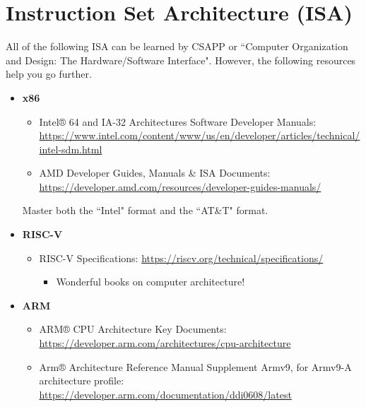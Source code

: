 \documentclass{article}
\begin{document}
\section{Instruction Set Architecture (ISA)}
All of the following ISA can be learned by CSAPP or ``Computer Organization and Design: The Hardware/Software Interface".
However, the following resources help you go further.
\begin{itemize}
    \item \textbf{x86}
    \begin{itemize}
        \item Intel® 64 and IA-32 Architectures Software Developer Manuals:\\
        \href{https://www.intel.com/content/www/us/en/developer/articles/technical/intel-sdm.html}{https://www.intel.com/content/www/us/en/developer/articles/technical/intel-sdm.html}
        \item AMD Developer Guides, Manuals \& ISA Documents:\\
        \href{https://developer.amd.com/resources/developer-guides-manuals/}{https://developer.amd.com/resources/developer-guides-manuals/}
    \end{itemize}
    Master both the ``Intel" format and the ``AT\&T" format.
    \item \textbf{RISC-V}
    \begin{itemize}
        \item RISC-V Specifications:
        \href{https://riscv.org/technical/specifications/}{https://riscv.org/technical/specifications/}
        \begin{itemize}
            \item Wonderful books on computer architecture!
        \end{itemize}
    \end{itemize}
    \item \textbf{ARM}
    \begin{itemize}
        \item ARM® CPU Architecture Key Documents:\\
        \href{https://developer.arm.com/architectures/cpu-architecture}{https://developer.arm.com/architectures/cpu-architecture}
        \item Arm® Architecture Reference Manual Supplement Armv9, for Armv9-A architecture profile:
        \href{https://developer.arm.com/documentation/ddi0608/latest}{https://developer.arm.com/documentation/ddi0608/latest}
    \end{itemize}

\end{itemize}
\end{document}
